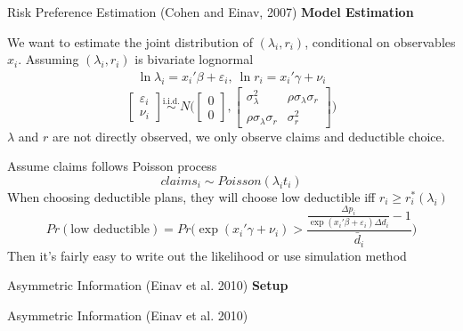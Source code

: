 \documentclass[10pt]{beamer}
\begin{document}
\begin{frame}{Risk Preference Estimation (Cohen and Einav, 2007)}
\textbf{Model Estimation}

We want to estimate the joint distribution of $(\lambda_i, r_i)$, conditional on observables $x_i$. Assuming $(\lambda_i, r_i)$ is bivariate lognormal
\begin{align*}
	\ln \lambda_i = x_i'\beta+\varepsilon_i,\ \ln r_i = x_i'\gamma + \nu_i
\end{align*}
$$\begin{bmatrix}
	\varepsilon_i\\
	\nu_i
\end{bmatrix}\overset{\text{i.i.d.}}{\sim}N\bigg(\begin{bmatrix}
	0\\
	0
\end{bmatrix},\begin{bmatrix}
	\sigma_\lambda^2 & \rho\sigma_\lambda\sigma_r\\
	\rho\sigma_\lambda\sigma_r & \sigma_r^2
\end{bmatrix}\bigg)$$
\bigskip
$\lambda$ and $r$ are not directly observed, we only observe claims and deductible choice.

Assume claims follows Poisson process
$$claims_i \sim Poisson(\lambda_i t_i)$$
When choosing deductible plans, they will choose low deductible iff $r_i\geq r_i^*(\lambda_i)$
$$Pr(\text{low deductible})=Pr\bigg(\exp(x_i'\gamma+\nu_i)>\frac{\frac{\Delta p_i}{\exp(x_i'\beta+\varepsilon_i)\Delta d_i}-1}{\bar d_i}\bigg)$$
Then it's fairly easy to write out the likelihood or use simulation method
\end{frame}


\begin{frame}{Asymmetric Information (Einav et al. 2010)}
\textbf{Setup}

\end{frame}

\begin{frame}{Asymmetric Information (Einav et al. 2010)}


\end{frame}
\end{document}
